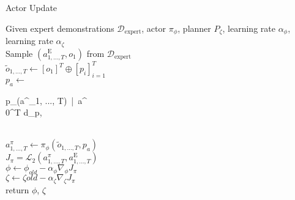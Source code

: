 \begin{algorithm}
    \caption{Actor Update}
    \label{Actor_Update_Alg}
    \begin{algorithmic}
    \Require Given expert demonstrations $\mathcal{D}_{\text{expert}}$, actor $\pi_{\phi}$, planner $P_{\zeta}$, 
    learning rate $\alpha_{\phi}$, learning rate $\alpha_{\zeta}$\\
    \State Sample $(a^{\text{E}}_{1, ..., T}, o_1)$ from $\mathcal{D}_{\text{expert}}$\\
    \State $\tilde{o}_{1, ..., T} \gets [o_1]^T \oplus [p_i]_{i=1}^T$ \hfill{} \\
    \State $p_a \gets $
    \begin{cases}
        p_{\zeta}(a^{}_{1, ..., T})\ |\ a^{} \notin {}\\
        0^{T \times d_p}, 
    \end{cases} \hfill{} \\
    \State $a^\pi_{1,...,T} \gets \pi_{\phi}(\tilde{o}_{1, ..., T}, p_a)$ \hfill{} \\
    \State $J_{\pi} = \mathcal{L}_2(a^\pi_{1,...,T}, a^{\text{E}}_{1, ..., T})$ \hfill{} \\
    \State $\phi \gets \phi_{old} - \alpha_{\phi} \nabla_{\phi}J_{\pi}$\\
    $\zeta \gets \zeta{old} - \alpha_{\zeta} \nabla_{\zeta}J_{\pi}$ \hfill{} \\
    \State return $\phi$, $\zeta$
\end{algorithmic}
\end{algorithm}

